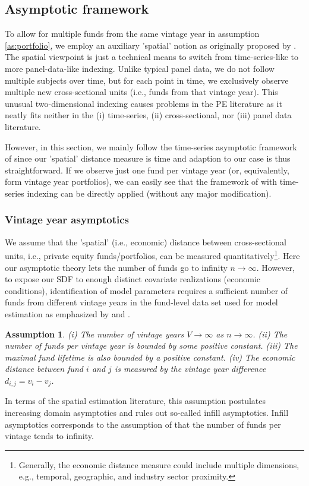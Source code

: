 \documentclass[12pt]{article}
\newtheorem{assume}{Assumption}
\begin{document}
\subsection{Asymptotic framework}
\label{sec:asymptotic_framework}

To allow for multiple funds from the same vintage year in assumption \ref{as:portfolio}, we employ an auxiliary 'spatial' notion as originally proposed by \cite{KN16}.
The spatial viewpoint is just a technical means to switch from time-series-like to more panel-data-like indexing.
Unlike typical panel data, we do not follow multiple subjects over time, but for each point in time, we exclusively observe multiple new cross-sectional units (i.e., funds from that vintage year).
This unusual two-dimensional indexing causes problems in the PE literature as it neatly fits neither in the (i) time-series, (ii) cross-sectional, nor (iii) panel data literature.

However, in this section, we mainly follow the time-series asymptotic framework of \cite{PP97} since our 'spatial' distance measure is time and adaption to our case is thus straightforward.
If we observe just one fund per vintage year (or, equivalently, form vintage year portfolios), we can easily see that the framework of \cite{PP97} with time-series indexing can be directly applied (without any major modification).


\subsubsection{Vintage year asymptotics}
We assume that the 'spatial' (i.e., economic) distance between cross-sectional units, i.e., private equity funds/portfolios, can be measured quantitatively\footnote{Generally, the economic distance measure could include multiple dimensions, e.g., temporal, geographic, and industry sector proximity.}.
Here our asymptotic theory lets the number of funds go to infinity $n \to \infty$.
However, to expose our SDF to enough distinct covariate realizations (economic conditions), identification of model parameters requires a sufficient number of funds from different vintage years in the fund-level data set used for model estimation as emphasized by \cite{DLP12} and \cite{KN16}.
\begin{assume}
	\label{as:vya}
	(i) The number of vintage years $V \to \infty$ as $n \to \infty$.
	(ii) The number of funds per vintage year is bounded by some positive constant.
	(iii) The maximal fund lifetime is also bounded by a positive constant.
	(iv) The economic distance between fund $i$ and $j$ is measured by the vintage year difference $d_{i,j}=v_i - v_j$.
\end{assume}
In terms of the spatial estimation literature, this assumption postulates increasing domain asymptotics and rules out so-called infill asymptotics. Infill asymptotics corresponds to the assumption of \cite{DLP12} that the number of funds per vintage tends to infinity.
\end{document}
